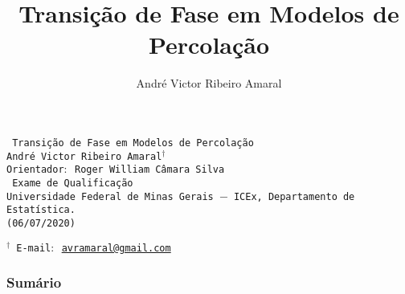 \documentclass[9pt]{beamer}
\title{Transição de Fase em Modelos de Percolação}
\author[André V. R. Amaral]{André Victor Ribeiro Amaral}
\theoremstyle{definition} %
\begin{document}
	\AtBeginSection{} %
	
	\begin{frame}[t]
		\centering
		\vspace{40pt}
		\texttt{{\Large {} Transição de Fase em Modelos de Percolação}} \\
		\vspace{30pt}
		\texttt{{\normalsize André Victor Ribeiro Amaral${}^{\dagger}$}} \\
		\texttt{{\small Orientador$:$ Roger William Câmara Silva}}\\
		\vspace{30pt}
		\texttt{{\normalsize {} Exame de Qualificação}} \\
		\vspace{30pt}
		\texttt{{\small Universidade Federal de Minas Gerais $-$ ICEx, Departamento de Estatística.}}\\
		\texttt{{\small (06/07/2020)}} \\
		\vspace{26pt}
		\begin{flushleft} \texttt{{\scriptsize ${}^{\dagger}$~E-mail$:$ \href{mailto:avramaral@gmail.com}{avramaral@gmail.com}}} \end{flushleft}
		
	\end{frame}

	\begin{frame}[t]
		\frametitle{Sumário}
		\tableofcontents
	\end{frame}
\end{document}
